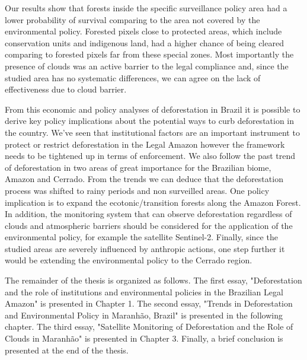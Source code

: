 Our results show that forests inside the specific surveillance policy area had a lower probability of survival comparing to the area not covered by the environmental policy. Forested pixels close to protected areas,  which include conservation units and indigenous land, had a higher chance of being cleared comparing to forested pixels far from these special zones. Most importantly the presence of clouds was an active barrier to the legal compliance and, since the studied area has no systematic differences, we can agree on the lack of effectiveness due to cloud barrier.

From this economic and policy analyses of deforestation in Brazil it is possible to derive key policy implications about the potential ways to curb deforestation in the country. We've seen that institutional factors are an important instrument to protect or restrict deforestation in the Legal Amazon however the framework needs to be tightened up in terms of enforcement. We also follow the past trend of deforestation in two areas of great importance for the Brazilian biome, Amazon and Cerrado. From the trends we can deduce that the deforestation process was shifted to rainy periods and non surveilled areas. One policy implication is to expand the ecotonic/transition forests along the Amazon Forest. In addition, the monitoring system that can observe deforestation regardless of clouds and atmospheric barriers should be considered for the application of the environmental policy, for example the satellite Sentinel-2. Finally, since the studied areas are severely influenced by anthropic actions, one step further it would be extending the environmental policy to the Cerrado region. 

The remainder of the thesis is organized as follows. The first essay, "Deforestation and the role of institutions and environmental policies in the Brazilian Legal Amazon" is presented in Chapter 1. The second essay, "Trends in Deforestation and Environmental Policy in Maranhão, Brazil" is presented in the following chapter. The third essay, "Satellite Monitoring of Deforestation and the Role of Clouds in Maranhão" is presented in Chapter 3. Finally, a brief conclusion is presented at the end of the thesis.